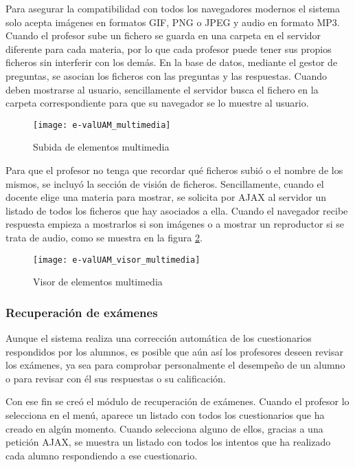 Para asegurar la compatibilidad con todos los navegadores modernos el sistema solo acepta imágenes en formatos GIF, PNG o JPEG y audio en formato MP3. Cuando el profesor sube un fichero se guarda en una carpeta en el servidor diferente para cada materia, por lo que cada profesor puede tener sus propios ficheros sin interferir con los demás. En la base de datos, mediante el gestor de preguntas, se asocian los ficheros con las preguntas y las respuestas. Cuando deben mostrarse al usuario, sencillamente el servidor busca el fichero en la carpeta correspondiente para que su navegador se lo muestre al usuario.

\begin{figure}[htp!]
	\centering
	\texttt{[image: e-valUAM\_multimedia]}
	\caption{Subida de elementos multimedia}
	\label{fig:e-valUAM multimedia profesor}
\end{figure}

Para que el profesor no tenga que recordar qué ficheros subió o el nombre de los mismos, se incluyó la sección de visión de ficheros. Sencillamente, cuando el docente elige una materia para mostrar, se solicita por AJAX al servidor un listado de todos los ficheros que hay asociados a ella. Cuando el navegador recibe respuesta empieza a mostrarlos si son imágenes o a mostrar un reproductor si se trata de audio, como se muestra en la figura \ref{fig:e-valUAM visor multimedia profesor}.

\begin{figure}[htp!]
	\centering
	\texttt{[image: e-valUAM\_visor\_multimedia]}
	\caption{Visor de elementos multimedia}
	\label{fig:e-valUAM visor multimedia profesor}
\end{figure}

\subsubsection{Recuperación de exámenes}

Aunque el sistema realiza una corrección automática de los cuestionarios respondidos por los alumnos, es posible que aún así los profesores deseen revisar los exámenes, ya sea para comprobar personalmente el desempeño de un alumno o para revisar con él sus respuestas o su calificación.

Con ese fin se creó el módulo de recuperación de exámenes. Cuando el profesor lo selecciona en el menú, aparece un listado con todos los cuestionarios que ha creado en algún momento. Cuando selecciona alguno de ellos, gracias a una petición AJAX, se muestra un listado con todos los intentos que ha realizado cada alumno respondiendo a ese cuestionario.

